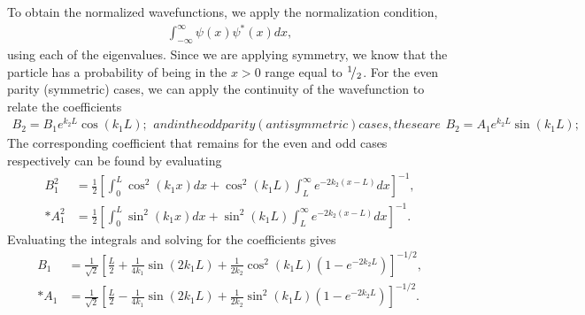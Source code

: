 To obtain the normalized wavefunctions, we apply the normalization condition, 
\begin{align} 
  \int_{-\infty}^{\infty} \psi(x) \psi^*(x) dx, \nonumber
\end{align}
using each of the eigenvalues. Since we are applying symmetry, we know that the particle has a probability of being in the $x > 0$ range equal to ${}^{1}\!/_{2}$. For the even parity (symmetric) cases, we can apply the continuity of the wavefunction to relate the coefficients
\begin{subequations}
\begin{align}
  B_2 = B_1 e^{k_2 L} \cos ( k_1 L );
\end{align}
and in the odd parity (antisymmetric) cases, these are
\begin{align}
  B_2 = A_1 e^{k_2 L} \sin ( k_1 L );
\end{align}
\end{subequations}
The corresponding coefficient that remains for the even and odd cases respectively can be found by evaluating
\begin{subequations}
\begin{align}
  B_1^2 &= \frac{1}{2} \left[ \int_0^L \cos^2(k_1 x) dx + \cos^2(k_1 L) \int_L^\infty  e^{- 2k_2(x-L)} dx \right]^{-1}, \\*
  A_1^2 &= \frac{1}{2} \left[ \int_0^L \sin^2(k_1 x) dx + \sin^2(k_1 L) \int_L^\infty  e^{- 2k_2(x-L)} dx \right]^{-1}.
\end{align}
\end{subequations}
Evaluating the integrals and solving for the coefficients gives
\begin{subequations}
\begin{align}
  B_1 &= \frac{1}{\sqrt{2}} \left[ \frac{L}{2} + \frac{1}{4k_1} \sin( 2 k_1 L ) + \frac{1}{2 k_2} \cos^2(k_1 L) \left( 1 -  e^{- 2k_2 L} \right) \right]^{-1/2}, \\*
  A_1 &= \frac{1}{\sqrt{2}} \left[ \frac{L}{2} - \frac{1}{4k_1} \sin( 2 k_1 L ) + \frac{1}{2 k_2} \sin^2(k_1 L) \left( 1 -  e^{- 2k_2 L} \right) \right]^{-1/2} .
\end{align}
\end{subequations}

